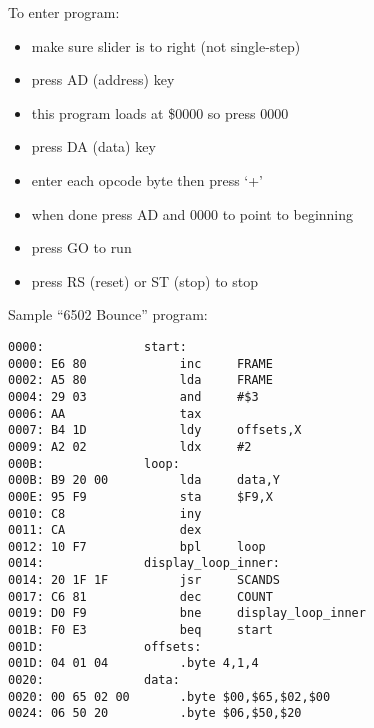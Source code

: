\documentclass{article}
\begin{document}
\noindent
To enter program:
\begin{itemize}
	\item make sure slider is to right (not single-step)
	\item press AD (address) key
	\item this program loads at \$0000 so press 0000
	\item press DA (data) key
	\item enter each opcode byte then press `+'
	\item when done press AD and 0000 to point to beginning
	\item press GO to run
	\item press RS (reset) or ST (stop) to stop
\end{itemize}

\noindent
Sample ``6502 Bounce'' program:
\begin{verbatim}
0000:              start:
0000: E6 80             inc     FRAME
0002: A5 80             lda     FRAME
0004: 29 03             and     #$3
0006: AA                tax
0007: B4 1D             ldy     offsets,X
0009: A2 02             ldx     #2
000B:              loop:
000B: B9 20 00          lda     data,Y
000E: 95 F9             sta     $F9,X
0010: C8                iny
0011: CA                dex
0012: 10 F7             bpl     loop
0014:              display_loop_inner:
0014: 20 1F 1F          jsr     SCANDS
0017: C6 81             dec     COUNT
0019: D0 F9             bne     display_loop_inner
001B: F0 E3             beq     start
001D:              offsets:
001D: 04 01 04          .byte 4,1,4
0020:              data:
0020: 00 65 02 00       .byte $00,$65,$02,$00
0024: 06 50 20          .byte $06,$50,$20
\end{verbatim}
\end{document}
